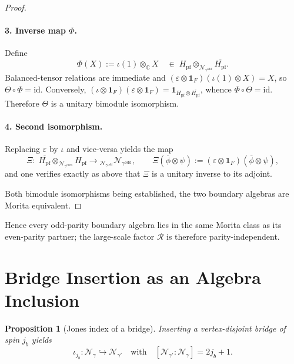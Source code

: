 \documentclass[11pt]{article}
\newtheorem{proposition}{Proposition}[section]
\begin{document}
\begin{proof}
\paragraph{3. Inverse map $\Phi$.}
Define
\[
  \Phi(X):=\iota(1)\otimes_{\mathbb C} X
  \quad\in\;
  H_{\mathrm{pf}}\!\otimes_{\mathcal N_{\gamma^{\mathrm{odd}}}}
  \overline{H_{\mathrm{pf}}}.
\]
Balanced-tensor relations are immediate and
$(\varepsilon\!\otimes\!\mathbf1_F)(\iota(1)\otimes X)=X$,
so $\Theta\!\circ\!\Phi=\mathrm{id}$.
Conversely,
$(\iota\!\otimes\!\mathbf1_F)(\varepsilon\!\otimes\!\mathbf1_F)
  =\mathbf1_{H_{\mathrm{pf}}\otimes\overline{H_{\mathrm{pf}}}}$,
whence $\Phi\!\circ\!\Theta=\mathrm{id}$.
Therefore $\Theta$ is a unitary bimodule isomorphism.

\paragraph{4. Second isomorphism.}
Replacing $\varepsilon$ by $\iota$ and vice-versa yields the map
\[
  \Xi:\;
  \overline{H_{\mathrm{pf}}}\!\otimes_{\mathcal N_{\gamma^{\mathrm{even}}}}
  H_{\mathrm{pf}}
  \longrightarrow
  {}_{\mathcal N_{\gamma^{\mathrm{odd}}}}\mathcal N_{\gamma^{\mathrm{odd}}},
  \qquad
  \Xi(\overline\phi\otimes\psi)
  :=(\varepsilon\!\otimes\!\mathbf1_F)(\overline\phi\otimes\psi),
\]
and one verifies exactly as above that $\Xi$ is a unitary inverse to its
adjoint.

\medskip
Both bimodule isomorphisms being established, the two boundary algebras
are Morita equivalent.
\end{proof}

Hence every odd-parity boundary algebra lies in the same Morita class as its
even-parity partner; the large-scale factor $\mathcal R$ is therefore
parity-independent.


\section{Bridge Insertion as an Algebra Inclusion}

\begin{proposition}[Jones index of a bridge]
Inserting a vertex-disjoint bridge of spin $j_b$ yields
\[
  \iota_{j_b}:\mathcal N_{\gamma}\hookrightarrow \mathcal N_{\gamma'}
\quad\text{with}\quad
  [\mathcal N_{\gamma'}:\mathcal N_{\gamma}] = 2j_b+1.
\]
\end{proposition}
\end{document}

